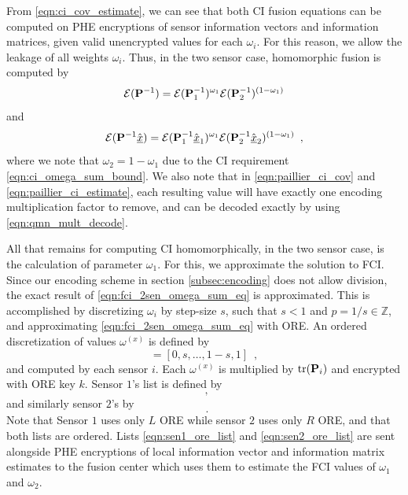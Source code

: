 \documentclass[letterpaper, 10 pt, conference]{ieeeconf}  %
\begin{document}
From \eqref{eqn:ci_cov_estimate}, we can see that both CI fusion equations can be computed on PHE encryptions of sensor information vectors and information matrices, given valid unencrypted values for each $\omega_i$. For this reason, we allow the leakage of all weights $\omega_i$. Thus, in the two sensor case, homomorphic fusion is computed by
\begin{equation}
   \mathcal{E}({{\mathbf{P}}}^{-1}) = \mathcal{E}({{\mathbf{P}}}^{-1}_1)^{\omega_1}\mathcal{E}({{\mathbf{P}}}^{-1}_2)^{(1 -\omega_1)} \label{eqn:paillier_ci_cov}
\end{equation}
and
\begin{equation}
   \mathcal{E}({{\mathbf{P}}}^{-1}\hat{{\underline{x}}}) = \mathcal{E}({{\mathbf{P}}}^{-1}_1\hat{{\underline{x}}}_1)^{\omega_1}\mathcal{E}({{\mathbf{P}}}^{-1}_2\hat{{\underline{x}}}_2)^{(1 - \omega_1)}\enspace, \label{eqn:paillier_ci_estimate}
\end{equation}
where we note that $\omega_2=1-\omega_1$ due to the CI requirement \eqref{eqn:ci_omega_sum_bound}. We also note that in \eqref{eqn:paillier_ci_cov} and \eqref{eqn:paillier_ci_estimate}, each resulting value will have exactly one encoding multiplication factor to remove, and can be decoded exactly by using \eqref{eqn:qmn_mult_decode}.
   
All that remains for computing CI homomorphically, in the two sensor case, is the calculation of parameter $\omega_1$. For this, we approximate the solution to FCI. Since our encoding scheme in section \ref{subsec:encoding} does not allow division, the exact result of \eqref{eqn:fci_2sen_omega_sum_eq} is approximated. This is accomplished by discretizing $\omega_i$ by step-size $s$, such that $s<1$ and $p=1/s \in \mathbb{Z}$, and approximating \eqref{eqn:fci_2sen_omega_sum_eq} with ORE. An ordered discretization of values $\omega^{(x)}$ is defined by
\begin{equation}
   [\omega^{(1)},\dots,\omega^{(p)}] = [0,s,\dots,1-s,1]\enspace,
\end{equation}
and computed by each sensor $i$. Each $\omega^{(x)}$ is multiplied by $\operatorname{tr}({{\mathbf{P}}}_i)$ and encrypted with ORE key $k$. Sensor $1$'s list is defined by 
\begin{equation}
   [\mathcal{E}^L_{ORE}(\omega^{(1)}\tr(\mP_1)),\dots,\mathcal{E}^L_{ORE}(\omega^{(p)}\tr(\mP_1))]\enspace, \label{eqn:sen1_ore_list}
\end{equation}
and similarly sensor $2$'s by
\begin{equation}
   [\mathcal{E}^R_{ORE}(\omega^{(1)}\tr(\mP_2)),\dots,\mathcal{E}^R_{ORE}(\omega^{(p)}\tr(\mP_2))]\enspace. \label{eqn:sen2_ore_list}
\end{equation}
Note that Sensor $1$ uses only $L$ ORE while sensor $2$ uses only $R$ ORE, and that both lists are ordered. Lists \eqref{eqn:sen1_ore_list} and \eqref{eqn:sen2_ore_list} are sent alongside PHE encryptions of local information vector and information matrix estimates to the fusion center which uses them to estimate the FCI values of $\omega_1$ and $\omega_2$.
\end{document}
